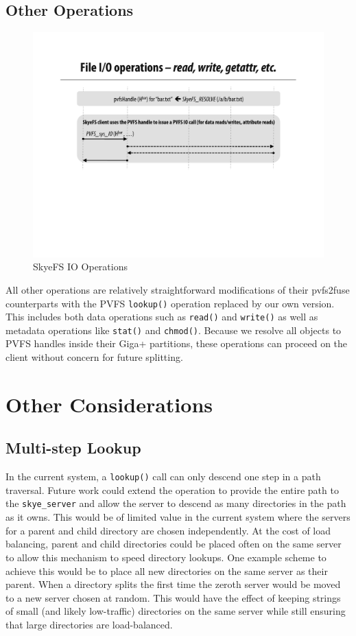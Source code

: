 \documentclass[twocolumn,letterpaper]{article}
\newcommand{\code}[1]{\texttt{#1}}
\begin{document}
\subsection{Other Operations}
\begin{figure}
\begin{center}
\includegraphics[scale=0.4]{figure-other}
\end{center}
\caption{SkyeFS IO Operations}
\end{figure}
All other operations are relatively straightforward modifications of their
pvfs2\-fuse counterparts with the PVFS \code{lookup()} operation replaced by
our own version.  This includes both data operations such as \code{read()} and
\code{write()} as well as metadata operations like \code{stat()} and
\code{chmod()}.  Because we resolve all objects to PVFS handles inside their
Giga+ partitions, these operations can proceed on the client without concern
for future splitting.

\section{Other Considerations}
\subsection{Multi-step Lookup}
In the current system, a \code{lookup()} call can only descend one step in a path
traversal.  Future work could extend the operation to provide the entire path
to the \code{skye\_\-server} and allow the server to descend as many
directories in the path as it owns.  This would be of limited value in the
current system where the servers for a parent and child directory are chosen
independently.  At the cost of load balancing, parent and child directories
could be placed often on the same server to allow this mechanism to speed
directory lookups.  One example scheme to achieve this would be to place all
new directories on the same server as their parent.  When a directory splits
the first time the zeroth server would be moved to a new server chosen at
random.  This would have the effect of keeping strings of small (and likely
low-traffic) directories on the same server while still ensuring that large
directories are load-balanced.
\end{document}
